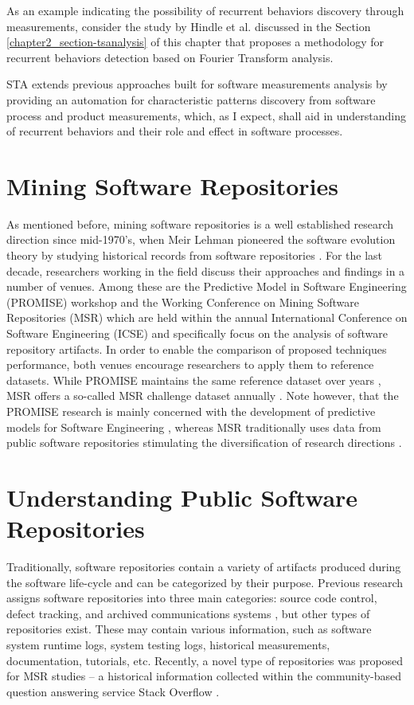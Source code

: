 As an example indicating the possibility of recurrent behaviors discovery through measurements, consider the 
study by Hindle et al. \cite{citeulike:10377345} discussed in the Section \ref{chapter2_section-tsanalysis} of 
this chapter that proposes a methodology for recurrent behaviors detection based on Fourier Transform analysis.

STA extends previous approaches built for software measurements analysis by providing an automation for 
characteristic patterns discovery from software process and product measurements, which, as I expect, shall 
aid in understanding of recurrent behaviors and their role and effect in software processes.

\section{Mining Software Repositories}
As mentioned before, mining software repositories is a well established research direction since 
mid-1970's, when Meir Lehman pioneered the software evolution theory by studying historical records from 
software repositories \cite{citeulike:2739216}. 
For the last decade, researchers working in the field discuss their approaches and findings in a number of venues. 
Among these are the Predictive Model in Software Engineering (PROMISE) workshop and the Working Conference on Mining 
Software Repositories (MSR) which are held within the annual International Conference on Software Engineering (ICSE)
and specifically focus on the analysis of software repository artifacts.
In order to enable the comparison of proposed techniques performance, both venues encourage researchers to 
apply them to reference datasets. 
While PROMISE maintains the same reference dataset over years \cite{promise12}, 
MSR offers a so-called MSR challenge dataset annually \cite{MSRChallenge2012} \cite{MSRChallenge2013}.
Note however, that the {PROMISE} research is mainly concerned with the development of predictive models for 
Software Engineering \cite{Menzies13}, whereas MSR traditionally uses data from public software repositories stimulating 
the diversification of research directions \cite{citeulike:12550438} \cite{citeulike:2710928} \cite{citeulike:7853299}.

\section{Understanding Public Software Repositories}\label{section_understanding}
Traditionally, software repositories contain a variety of artifacts produced during the software life-cycle
and can be categorized by their purpose.
Previous research assigns software repositories into three main categories: source code control, 
defect tracking, and archived communications systems \cite{citeulike:4534888}, but other types of repositories exist. 
These may contain various information, such as software system runtime logs, system testing logs, 
historical measurements, documentation, tutorials, etc.
Recently, a novel type of repositories was proposed for MSR studies -- a historical information collected within the 
community-based question answering service Stack Overflow \cite{MSRChallenge2013}.

